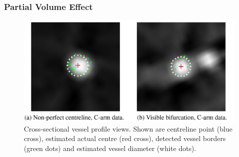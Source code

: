 \begin{frame}
	\frametitle{Partial Volume Effect}

	\begin{figure}[tbp]
		\centering
		\includegraphics[height=0.7\textheight]{images/schwemmer_partial_volume.jpg}
		\caption{Cross-sectional vessel profile views. Shown are centreline point (blue cross), estimated actual centre (red cross), detected vessel borders (green dots) and estimated vessel diameter (white dots).}%
		\label{fig:ct_partial_1}
	\end{figure}
	\vspace{-0.5cm}

	\flushright{}
	\tiny

\end{frame}

